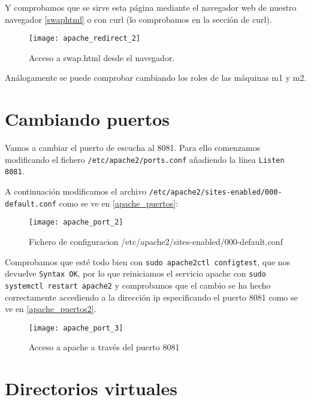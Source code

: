 Y comprobamos que se sirve esta página mediante el navegador web de nuestro navegador \eqref{swaphtml} o con curl (lo comprobamos en la sección de curl).

\begin{figure}[h!]
\begin{center}
\caption{Acceso a swap.html desde el navegador.}
\label{swaphtml}
\texttt{[image: apache\_redirect\_2]}
\end{center}
\end{figure}

Análogamente se puede comprobar cambiando los roles de las máquinas m1 y m2.

\section{Cambiando puertos}

Vamos a cambiar el puerto de escucha al 8081. Para ello comenzamos modificando el fichero \verb|/etc/apache2/ports.conf| añadiendo la línea \verb|Listen 8081|.

A continuación modificamos el archivo \verb|/etc/apache2/sites-enabled/000-default.conf| como se ve en \eqref{apache_puertos}:

\begin{figure}[h!]
\begin{center}
\caption{Fichero de configuracion /etc/apache2/sites-enabled/000-default.conf}
\label{apache_puertos}
\texttt{[image: apache\_port\_2]}
\end{center}
\end{figure}

Comprobamos que esté todo bien con \verb|sudo apache2ctl configtest|, que nos devuelve \verb|Syntax OK|, por lo que reiniciamos el servicio apache con \verb|sudo systemctl restart apache2| y comprobamos que el cambio se ha hecho correctamente accediendo a la dirección ip especificando el puerto 8081 como se ve en \eqref{apache_puertos2}.

\begin{figure}[h!]
\begin{center}
\caption{Acceso a apache a través del puerto 8081}
\label{apache_puertos2}
\texttt{[image: apache\_port\_3]}
\end{center}
\end{figure}

\section{Directorios virtuales}

